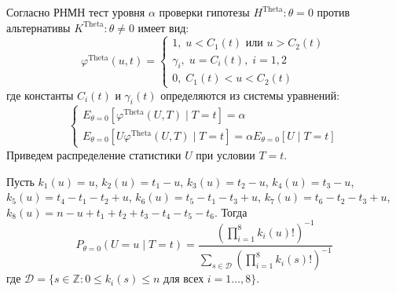     Согласно \cite{Lehmann1986} РНМН тест уровня $\alpha$ проверки гипотезы $H^{\text{Theta}}:\theta=0$ против альтернативы $K^{\text{Theta}}:\theta \neq 0$ имеет вид:
    $$
    \varphi^{\text{Theta}}(u,t)=\begin{cases}
        1, \; u<C_1(t) \text{ или } u>C_2(t)\\
        \gamma_i, \; u=C_i(t), \; i=1,2\\
        0, \; C_1(t)<u<C_2(t)
    \end{cases}
    $$
    где константы $C_i(t)$ и $\gamma_i(t)$ определяются из системы уравнений:
    $$
    \begin{cases}
        E_{\theta=0}[\varphi^{\text{Theta}}(U,T) \mid T=t]=\alpha \\
        E_{\theta=0}[U\varphi^{\text{Theta}}(U,T) \mid T=t]=\alpha E_{\theta=0}[U \mid T=t]
    \end{cases}
    $$
    Приведем распределение статистики $U$ при условии $T=t$.      
    \begin{lemma}\label{u_dist}
        Пусть $k_1(u)=u$, $k_2(u)=t_1-u$, $k_3(u)=t_2-u$, $k_4(u)=t_3-u$, $k_5(u)=t_4-t_1-t_2+u$, $k_6(u)=t_5-t_1-t_3+u$,
        $k_7(u)=t_6 - t_2 - t_3 + u$, $k_8(u)=n-u+t_1+t_2+t_3-t_4-t_5-t_6$.
        Тогда
        $$P_{\theta=0}(U=u \mid T=t)=\dfrac{(\prod_{i=1}^8 k_i(u)!)^{-1}}
            {\sum_{s\in \mathcal{D}} (\prod_{i=1}^8 k_i(s)!)^{-1}}$$
        где $\mathcal{D}=\{s \in \mathbb{Z}: 0\leq k_i(s) \leq n \text{ для всех } i=1\ldots,8\}$.
    \end{lemma}
